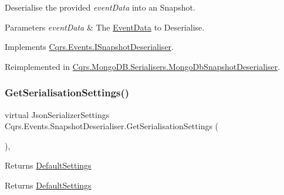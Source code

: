 Deserialise the provided {\itshape event\+Data}  into an Snapshot. 


\begin{DoxyParams}{Parameters}
{\em event\+Data} & The \hyperlink{classCqrs_1_1Events_1_1EventData}{Event\+Data} to Deserialise.\\
\hline
\end{DoxyParams}


Implements \hyperlink{interfaceCqrs_1_1Events_1_1ISnapshotDeserialiser_af5520b6bc814efe3cc86e611afd390ae_af5520b6bc814efe3cc86e611afd390ae}{Cqrs.\+Events.\+I\+Snapshot\+Deserialiser}.



Reimplemented in \hyperlink{classCqrs_1_1MongoDB_1_1Serialisers_1_1MongoDbSnapshotDeserialiser_ad7963b969a1edd5451605887933c0c89_ad7963b969a1edd5451605887933c0c89}{Cqrs.\+Mongo\+D\+B.\+Serialisers.\+Mongo\+Db\+Snapshot\+Deserialiser}.

\mbox{\label{classCqrs_1_1Events_1_1SnapshotDeserialiser_a3596360abc7bddc12a2a6bb9c6137dec_a3596360abc7bddc12a2a6bb9c6137dec}} 
\subsubsection{\texorpdfstring{Get\+Serialisation\+Settings()}{GetSerialisationSettings()}}
{\footnotesize\ttfamily virtual Json\+Serializer\+Settings Cqrs.\+Events.\+Snapshot\+Deserialiser.\+Get\+Serialisation\+Settings (\begin{DoxyParamCaption}{ }\end{DoxyParamCaption})\hspace{0.3cm}{\ttfamily [protected]}, {\ttfamily [virtual]}}



Returns \hyperlink{classCqrs_1_1Events_1_1SnapshotDeserialiser_a0fb10c8d8409303ba635b1b596449844_a0fb10c8d8409303ba635b1b596449844}{Default\+Settings} 

\begin{DoxyReturn}{Returns}
\hyperlink{classCqrs_1_1Events_1_1SnapshotDeserialiser_a0fb10c8d8409303ba635b1b596449844_a0fb10c8d8409303ba635b1b596449844}{Default\+Settings}
\end{DoxyReturn}


